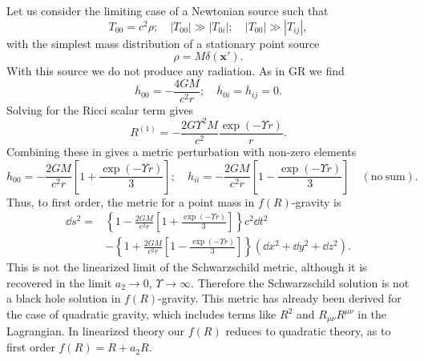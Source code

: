 Let us consider the limiting case of a Newtonian source such that
\begin{equation}
T_{00} = c^2\rho; \quad |T_{00}| \gg |T_{0i}|; \quad |T_{00}| \gg |T_{ij}|,
\end{equation}
with the simplest mass distribution of a stationary point source
\begin{equation}
\rho = M\delta(\boldsymbol{x'}).
\end{equation}
With this source we do not produce any radiation. As in GR we find
\begin{equation}
\overline{h}_{00} = -\frac{4GM}{c^2r}; \quad \overline{h}_{0i} = \overline{h}_{ij} = 0.
\end{equation}
Solving for the Ricci scalar term gives
\begin{equation}
R^{(1)} = -\frac{2 G \Upsilon^2 M}{c^2}\frac{\exp(- \Upsilon r)}{r}.
\end{equation}
Combining these in  gives a metric perturbation with non-zero elements 
\begin{equation}
h_{00} = -\frac{2GM}{c^2r}\left[1 + \frac{\exp(- \Upsilon r)}{3}\right]; \quad h_{ii} = -\frac{2GM}{c^2r}\left[1 - \frac{\exp(- \Upsilon r)}{3}\right] \quad \mathrm{(no\: sum)}.
\end{equation}
Thus, to first order, the metric for a point mass in $f(R)$-gravity is\cite{Capozziello2009a, Naf2010}
\begin{align}
\dd s^2 = & {} \left\{1-\frac{2GM}{c^2r}\left[1 + \frac{\exp(- \Upsilon r)}{3}\right]\right\}c^2\dd t^2 \nonumber \\
 & - {} \left\{1+\frac{2GM}{c^2r}\left[1 - \frac{\exp(- \Upsilon r)}{3}\right]\right\}\left(\dd x^2 + \dd y^2 + \dd z^2\right).
\label{eq:f(R)_Schw}
\end{align}
This is not the linearized limit of the Schwarzschild metric, although it is recovered in the limit $a_2 \rightarrow 0$, $\Upsilon \rightarrow \infty$. Therefore the Schwarzschild solution is not a black hole solution in $f(R)$-gravity\cite{Chiba2007a}. This metric has already been derived for the case of quadratic gravity, which includes terms like $R^2$ and $R_{\mu\nu}R^{\mu\nu}$ in the Lagrangian\cite{Pechlaner1966, Stelle1978, Schmidt1986, Teyssandier1990}. In linearized theory our $f(R)$ reduces to quadratic theory, as to first order $f(R) = R + a_2 R$.

